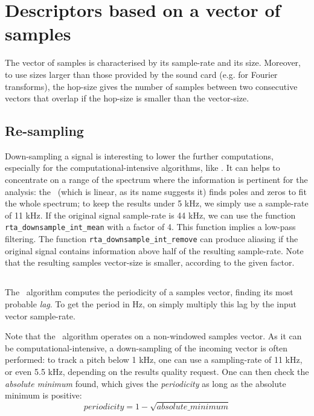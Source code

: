 \documentclass[a4paper, twoside]{article}
\begin{document}
\section{Descriptors based on a vector of samples}
\label{sec:samples_vector_descriptors}

The vector of samples is characterised by its sample-rate and its
size. Moreover, to use sizes larger than those provided by the
sound card (e.g. for Fourier transforms), the hop-size gives the number
of samples between two consecutive vectors that overlap if the hop-size
is smaller than the vector-size.

\subsection{Re-sampling}
\label{sec:resampling}

Down-sampling a signal is interesting to lower the further
computations, especially for the computational-intensive algorithms,
like \yin. It can helps to concentrate on a range of the
spectrum where the information is pertinent for the analysis: the
\lpc\ (which is linear, as its name suggests it) finds poles
and zeros to fit the whole spectrum; to keep the results under 5 kHz,
we simply use a sample-rate of 11 kHz. If the original signal
sample-rate is 44 kHz, we can use the function
\texttt{rta\_downsample\_int\_mean} with a factor of 4. This function
implies a low-pass filtering. The function
\texttt{rta\_downsample\_int\_remove} can produce aliasing if the
original signal contains information above half of the resulting
sample-rate. Note that the resulting samples vector-size is smaller,
according to the given factor.

\subsection{\Yin}
\label{sec:yin}

The \yin\ algorithm computes the periodicity of a samples
vector, finding its most probable \emph{lag}. To get the period in Hz,
on simply multiply this lag by the input vector sample-rate.

Note that the \yin\ algorithm operates on a non-windowed
samples vector. As it can be computational-intensive, a down-sampling
of the incoming vector is often performed: to track a pitch below 1
kHz, one can use a sampling-rate of 11 kHz, or even 5.5 kHz, depending
on the results quality request. One can then check the \emph{absolute
  minimum} found, which gives the \emph{periodicity} as long as the
absolute minimum is positive:
$$periodicity = 1 - \sqrt{absolute\_minimum}$$
\end{document}
